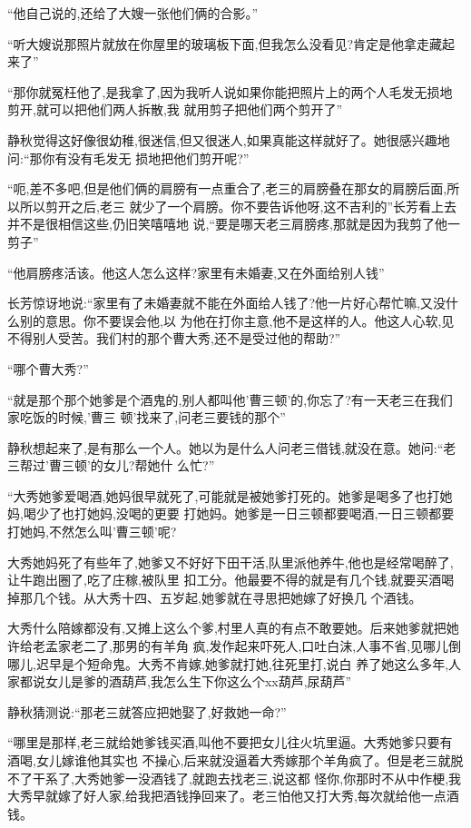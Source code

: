 ﻿\documentclass[12pt]{article}
\begin{document}
``他自己说的,还给了大嫂一张他们俩的合影。''

``听大嫂说那照片就放在你屋里的玻璃板下面,但我怎么没看见?肯定是他拿走藏起来了\myrule ''

``那你就冤枉他了,是我拿了,因为我听人说如果你能把照片上的两个人毛发无损地剪开,就可以把他们两人拆散,我
就用剪子把他们两个剪开了\myrule ''

静秋觉得这好像很幼稚,很迷信,但又很迷人,如果真能这样就好了。她很感兴趣地问:``那你\myrule 有没有毛发无
损地把他们剪开呢?''

``呃,差不多吧,但是他们俩的肩膀有一点重合了,老三的肩膀叠在那女的肩膀后面,所以\myrule 所以剪开之后,老三
就\myrule 少了一个肩膀。你不要告诉他呀,这不吉利的\myrule ''长芳看上去并不是很相信这些,仍旧笑嘻嘻地
说,``要是哪天老三肩膀疼,那就是因为我剪了他一剪子\myrule ''

``他肩膀疼活该。他这人怎么这样?家里有未婚妻,又在外面\myrule 给别人钱\myrule ''

长芳惊讶地说:``家里有了未婚妻就不能在外面给人钱了?他一片好心帮忙嘛,又没什么别的意思。你不要误会他,以
为他在打你主意,他不是这样的人。他这人心软,见不得别人受苦。我们村的那个曹大秀,还不是受过他的帮助?''

``哪个曹大秀?''

``就是那个\myrule 那个她爹是个酒鬼的,别人都叫他'曹三顿'的,你忘了?有一天老三在我们家吃饭的时候,'曹三
顿'找来了,问老三要钱的那个\myrule ''

静秋想起来了,是有那么一个人。她以为是什么人问老三借钱,就没在意。她问:``老三帮过'曹三顿'的女儿?帮她什
么忙?''

``大秀她爹爱喝酒,她妈很早就死了,可能就是被她爹打死的。她爹是喝多了也打她妈,喝少了也打她妈,没喝的更要
打她妈。她爹是一日三顿都要喝酒,一日三顿都要打她妈,不然怎么叫'曹三顿'呢?

大秀她妈死了有些年了,她爹又不好好下田干活,队里派他养牛,他也是经常喝醉了,让牛跑出圈了,吃了庄稼,被队里
扣工分。他最要不得的就是有几个钱,就要买酒喝掉那几个钱。从大秀十四、五岁起,她爹就在寻思把她嫁了好换几
个酒钱。

大秀什么陪嫁都没有,又摊上这么个爹,村里人真的有点不敢要她。后来她爹就把她许给老孟家老二了,那男的有羊角
疯,发作起来吓死人,口吐白沫,人事不省,见哪儿倒哪儿,迟早是个短命鬼。大秀不肯嫁,她爹就打她,往死里打,说白
养了她这么多年,人家都说女儿是爹的酒葫芦,我怎么生下你这么个xx葫芦,尿葫芦\myrule ''

静秋猜测说:``那\myrule 老三就\myrule 答应把她娶了,好救她一命?''

``哪里是那样,老三就给她爹钱买酒,叫他不要把女儿往火坑里逼\myrule 。大秀她爹只要有酒喝,女儿嫁谁他其实也
不操心,后来就没逼着大秀嫁那个羊角疯了。但是老三就脱不了干系了,大秀她爹一没酒钱了,就跑去找老三,说这都
怪你,你那时不从中作梗,我大秀早就嫁了好人家,给我把酒钱挣回来了。老三怕他又打大秀,每次就给他一点酒钱。
\end{document}
